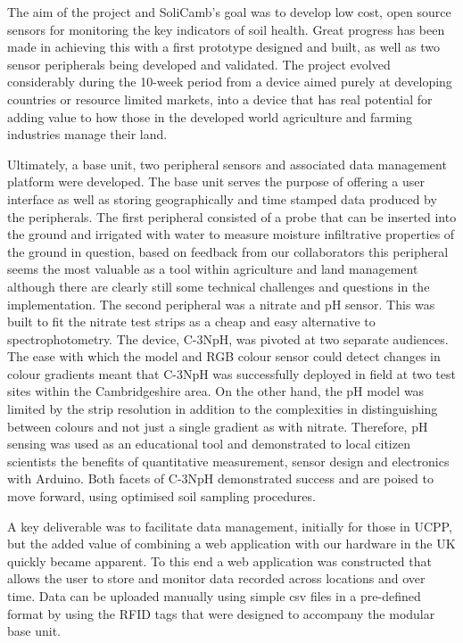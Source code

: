 The aim of the project and SoliCamb's goal was to develop low cost, open source sensors for monitoring the key indicators of soil health. Great progress has been made in achieving this with a first
prototype designed and built, as well as two sensor peripherals being developed and validated. 
The project evolved considerably during the 10-week period from a device aimed purely at developing countries or resource limited markets, into a device  that has real potential for adding value to how those in the developed world agriculture and farming industries manage their land. 

Ultimately, a base unit, two peripheral sensors and associated data management platform were developed. 
The base unit serves the purpose of offering a user interface as well as storing geographically and time stamped data produced by the peripherals. 
The first peripheral consisted of a probe that can be inserted into the ground and irrigated with water to measure moisture infiltrative properties of the ground in question, based on feedback from our collaborators this peripheral seems the most valuable as a tool within agriculture and land management although there are clearly still some technical challenges and questions in the implementation.
The second peripheral was a nitrate and pH sensor. This was built to fit the nitrate test strips as a cheap and easy alternative to spectrophotometry. The device, C-3NpH, was pivoted at two separate audiences. The ease with which the model and RGB colour sensor could detect changes in colour gradients meant that C-3NpH was successfully deployed in field at two test sites within the Cambridgeshire area. On the other hand, the pH model was limited by the strip resolution in addition to the complexities in distinguishing between colours and not just a single gradient as with nitrate. Therefore, pH sensing was used as an educational tool and demonstrated to local citizen scientists the benefits of quantitative measurement, sensor design and electronics with Arduino. Both facets of C-3NpH demonstrated success and are poised to move forward, using optimised soil sampling procedures. 

A key deliverable was to facilitate data management, initially for those in UCPP, but the added value of combining a web application with our hardware in the UK quickly became apparent. To this end a  web application was constructed that allows the user to store and monitor data recorded across locations and over time. Data can be uploaded manually using simple csv files in a pre-defined format by using the RFID tags that were designed to accompany the modular base unit.

